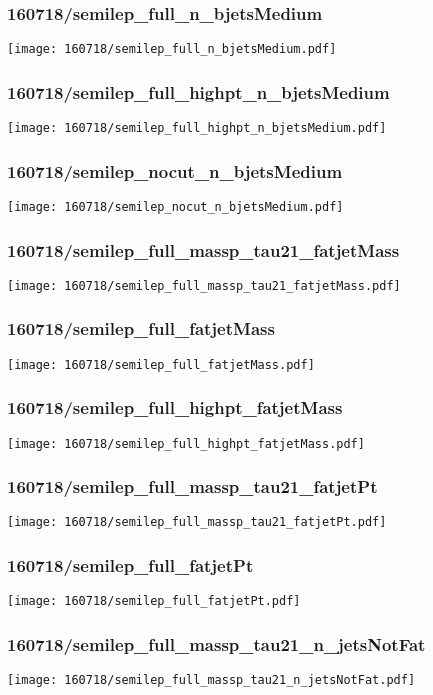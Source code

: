\begin{frame}
   \frametitle{\small 160718/semilep\_full\_n\_bjetsMedium}
   \centering
   \texttt{[image: 160718/semilep\_full\_n\_bjetsMedium.pdf]}
\end{frame}

\begin{frame}
   \frametitle{\small 160718/semilep\_full\_highpt\_n\_bjetsMedium}
   \centering
   \texttt{[image: 160718/semilep\_full\_highpt\_n\_bjetsMedium.pdf]}
\end{frame}

\begin{frame}
   \frametitle{\small 160718/semilep\_nocut\_n\_bjetsMedium}
   \centering
   \texttt{[image: 160718/semilep\_nocut\_n\_bjetsMedium.pdf]}
\end{frame}

\begin{frame}
   \frametitle{\small 160718/semilep\_full\_massp\_tau21\_fatjetMass}
   \centering
   \texttt{[image: 160718/semilep\_full\_massp\_tau21\_fatjetMass.pdf]}
\end{frame}

\begin{frame}
   \frametitle{\small 160718/semilep\_full\_fatjetMass}
   \centering
   \texttt{[image: 160718/semilep\_full\_fatjetMass.pdf]}
\end{frame}

\begin{frame}
   \frametitle{\small 160718/semilep\_full\_highpt\_fatjetMass}
   \centering
   \texttt{[image: 160718/semilep\_full\_highpt\_fatjetMass.pdf]}
\end{frame}

\begin{frame}
   \frametitle{\small 160718/semilep\_full\_massp\_tau21\_fatjetPt}
   \centering
   \texttt{[image: 160718/semilep\_full\_massp\_tau21\_fatjetPt.pdf]}
\end{frame}

\begin{frame}
   \frametitle{\small 160718/semilep\_full\_fatjetPt}
   \centering
   \texttt{[image: 160718/semilep\_full\_fatjetPt.pdf]}
\end{frame}

\begin{frame}
   \frametitle{\small 160718/semilep\_full\_massp\_tau21\_n\_jetsNotFat}
   \centering
   \texttt{[image: 160718/semilep\_full\_massp\_tau21\_n\_jetsNotFat.pdf]}
\end{frame}

